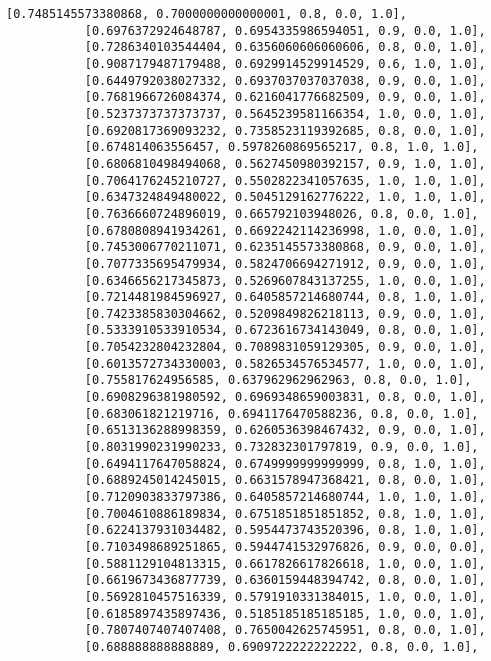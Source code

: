 \documentclass[11pt]{article}
\begin{document}
\begin{Verbatim}[commandchars=\\\{\}]
           [0.7485145573380868, 0.7000000000000001, 0.8, 0.0, 1.0],
           [0.6976372924648787, 0.6954335986594051, 0.9, 0.0, 1.0],
           [0.7286340103544404, 0.6356060606060606, 0.8, 0.0, 1.0],
           [0.9087179487179488, 0.6929914529914529, 0.6, 1.0, 1.0],
           [0.6449792038027332, 0.6937037037037038, 0.9, 0.0, 1.0],
           [0.7681966726084374, 0.6216041776682509, 0.9, 0.0, 1.0],
           [0.5237373737373737, 0.5645239581166354, 1.0, 0.0, 1.0],
           [0.6920817369093232, 0.7358523119392685, 0.8, 0.0, 1.0],
           [0.674814063556457, 0.5978260869565217, 0.8, 1.0, 1.0],
           [0.6806810498494068, 0.5627450980392157, 0.9, 1.0, 1.0],
           [0.7064176245210727, 0.5502822341057635, 1.0, 1.0, 1.0],
           [0.6347324849480022, 0.5045129162776222, 1.0, 1.0, 1.0],
           [0.7636660724896019, 0.665792103948026, 0.8, 0.0, 1.0],
           [0.6780808941934261, 0.6692242114236998, 1.0, 0.0, 1.0],
           [0.7453006770211071, 0.6235145573380868, 0.9, 0.0, 1.0],
           [0.7077335695479934, 0.5824706694271912, 0.9, 0.0, 1.0],
           [0.6346656217345873, 0.5269607843137255, 1.0, 0.0, 1.0],
           [0.7214481984596927, 0.6405857214680744, 0.8, 1.0, 1.0],
           [0.7423385830304662, 0.5209849826218113, 0.9, 0.0, 1.0],
           [0.5333910533910534, 0.6723616734143049, 0.8, 0.0, 1.0],
           [0.7054232804232804, 0.7089831059129305, 0.9, 0.0, 1.0],
           [0.6013572734330003, 0.5826534576534577, 1.0, 0.0, 1.0],
           [0.755817624956585, 0.637962962962963, 0.8, 0.0, 1.0],
           [0.6908296381980592, 0.6969348659003831, 0.8, 0.0, 1.0],
           [0.683061821219716, 0.6941176470588236, 0.8, 0.0, 1.0],
           [0.6513136288998359, 0.6260536398467432, 0.9, 0.0, 1.0],
           [0.8031990231990233, 0.732832301797819, 0.9, 0.0, 1.0],
           [0.6494117647058824, 0.6749999999999999, 0.8, 1.0, 1.0],
           [0.6889245014245015, 0.6631578947368421, 0.8, 0.0, 1.0],
           [0.7120903833797386, 0.6405857214680744, 1.0, 1.0, 1.0],
           [0.7004610886189834, 0.6751851851851852, 0.8, 1.0, 1.0],
           [0.6224137931034482, 0.5954473743520396, 0.8, 1.0, 1.0],
           [0.7103498689251865, 0.5944741532976826, 0.9, 0.0, 0.0],
           [0.5881129104813315, 0.6617826617826618, 1.0, 0.0, 1.0],
           [0.6619673436877739, 0.6360159448394742, 0.8, 0.0, 1.0],
           [0.5692810457516339, 0.5791910331384015, 1.0, 0.0, 1.0],
           [0.6185897435897436, 0.5185185185185185, 1.0, 0.0, 1.0],
           [0.7807407407407408, 0.7650042625745951, 0.8, 0.0, 1.0],
           [0.688888888888889, 0.6909722222222222, 0.8, 0.0, 1.0],

\end{Verbatim}
\end{document}

